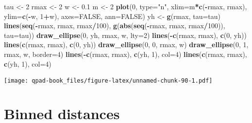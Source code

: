 \documentclass[12pt,]{book}
\newenvironment{Shaded}{\begin{snugshade}}{\end{snugshade}}
\newcommand{\DataTypeTok}[1]{\textcolor[rgb]{0.13,0.29,0.53}{#1}}
\newcommand{\DecValTok}[1]{\textcolor[rgb]{0.00,0.00,0.81}{#1}}
\newcommand{\FloatTok}[1]{\textcolor[rgb]{0.00,0.00,0.81}{#1}}
\newcommand{\KeywordTok}[1]{\textcolor[rgb]{0.13,0.29,0.53}{\textbf{#1}}}
\newcommand{\NormalTok}[1]{#1}
\newcommand{\OperatorTok}[1]{\textcolor[rgb]{0.81,0.36,0.00}{\textbf{#1}}}
\newcommand{\OtherTok}[1]{\textcolor[rgb]{0.56,0.35,0.01}{#1}}
\newcommand{\StringTok}[1]{\textcolor[rgb]{0.31,0.60,0.02}{#1}}
\begin{document}
\begin{Shaded}
\begin{Highlighting}[]
\NormalTok{tau <-}\StringTok{ }\DecValTok{2}
\NormalTok{rmax <-}\StringTok{ }\DecValTok{2}
\NormalTok{w <-}\StringTok{ }\FloatTok{0.1}
\NormalTok{m <-}\StringTok{ }\DecValTok{2}
\KeywordTok{plot}\NormalTok{(}\DecValTok{0}\NormalTok{, }\DataTypeTok{type=}\StringTok{"n"}\NormalTok{, }\DataTypeTok{xlim=}\NormalTok{m}\OperatorTok{*}\KeywordTok{c}\NormalTok{(}\OperatorTok{-}\NormalTok{rmax, rmax), }\DataTypeTok{ylim=}\KeywordTok{c}\NormalTok{(}\OperatorTok{-}\NormalTok{w, }\DecValTok{1}\OperatorTok{+}\NormalTok{w), }
  \DataTypeTok{axes=}\OtherTok{FALSE}\NormalTok{, }\DataTypeTok{ann=}\OtherTok{FALSE}\NormalTok{)}
\NormalTok{yh <-}\StringTok{ }\KeywordTok{g}\NormalTok{(rmax, }\DataTypeTok{tau=}\NormalTok{tau)}
\KeywordTok{lines}\NormalTok{(}\KeywordTok{seq}\NormalTok{(}\OperatorTok{-}\NormalTok{rmax, rmax, rmax}\OperatorTok{/}\DecValTok{100}\NormalTok{),}
  \KeywordTok{g}\NormalTok{(}\KeywordTok{abs}\NormalTok{(}\KeywordTok{seq}\NormalTok{(}\OperatorTok{-}\NormalTok{rmax, rmax, rmax}\OperatorTok{/}\DecValTok{100}\NormalTok{)), }\DataTypeTok{tau=}\NormalTok{tau))}
\KeywordTok{draw_ellipse}\NormalTok{(}\DecValTok{0}\NormalTok{, yh, rmax, w, }\DataTypeTok{lty=}\DecValTok{2}\NormalTok{)}
\KeywordTok{lines}\NormalTok{(}\OperatorTok{-}\KeywordTok{c}\NormalTok{(rmax, rmax), }\KeywordTok{c}\NormalTok{(}\DecValTok{0}\NormalTok{, yh))}
\KeywordTok{lines}\NormalTok{(}\KeywordTok{c}\NormalTok{(rmax, rmax), }\KeywordTok{c}\NormalTok{(}\DecValTok{0}\NormalTok{, yh))}
\KeywordTok{draw_ellipse}\NormalTok{(}\DecValTok{0}\NormalTok{, }\DecValTok{0}\NormalTok{, rmax, w)}
\KeywordTok{draw_ellipse}\NormalTok{(}\DecValTok{0}\NormalTok{, }\DecValTok{1}\NormalTok{, rmax, w, }\DataTypeTok{border=}\DecValTok{4}\NormalTok{)}
\KeywordTok{lines}\NormalTok{(}\OperatorTok{-}\KeywordTok{c}\NormalTok{(rmax, rmax), }\KeywordTok{c}\NormalTok{(yh, }\DecValTok{1}\NormalTok{), }\DataTypeTok{col=}\DecValTok{4}\NormalTok{)}
\KeywordTok{lines}\NormalTok{(}\KeywordTok{c}\NormalTok{(rmax, rmax), }\KeywordTok{c}\NormalTok{(yh, }\DecValTok{1}\NormalTok{), }\DataTypeTok{col=}\DecValTok{4}\NormalTok{)}
\end{Highlighting}
\end{Shaded}

\texttt{[image: qpad-book\_files/figure-latex/unnamed-chunk-90-1.pdf]}

\hypertarget{binned-distances}{%
\section{Binned distances}\label{binned-distances}}
\end{document}
